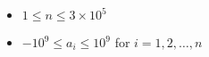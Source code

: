 \begin{itemize}
    \tightlist
    \item $1 \leq n \leq 3 \times 10^5$
    \item $-10^9 \leq a_i \leq 10^9$ for $i = 1, 2, \ldots, n$
\end{itemize}
    